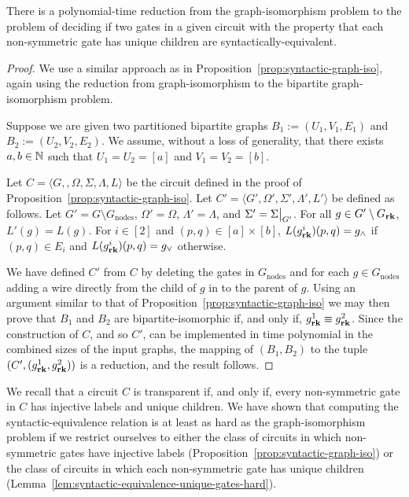 \documentclass[../paper.tex]{subfiles}
\begin{document}
\begin{lem}
  There is a polynomial-time reduction from the graph-isomorphism problem to the
  problem of deciding if two gates in a given circuit with the property that
  each non-symmetric gate has unique children are syntactically-equivalent.
  \label{lem:syntactic-equivalence-unique-gates-hard}
\end{lem}
\begin{proof}
  We use a similar approach as in Proposition~\ref{prop:syntactic-graph-iso},
  again using the reduction from graph-isomorphism to the bipartite
  graph-isomorphism problem.
  
  Suppose we are given two partitioned bipartite graphs $B_1 := (U_1, V_1, E_1)$
  and $B_2 := (U_2, V_2, E_2)$. We assume, without a loss of generality, that
  there exists $a, b \in \mathbb{N}$ such that $U_1 = U_2 = [a]$ and $V_1 = V_2 =
  [b]$.

  Let $C = \langle G, , \Omega, \Sigma, \Lambda, L \rangle$ be the circuit
  defined in the proof of Proposition~\ref{prop:syntactic-graph-iso}. Let $C' =
  \langle G', \Omega', \Sigma', \Lambda', L'\rangle$ be defined as follows. Let
  $G' = G \setminus G_{\text{nodes}}$, $\Omega' = \Omega$, $\Lambda' = \Lambda$,
  and $\Sigma' = \restr{\Sigma}{G'}$. For all $g \in G' \setminus G_{\text{\textbf{rk}}}$,
  $L'(g) = L(g)$. For $i \in [2]$ and $(p,q) \in [a] \times [b]$,
  $L(g^i_{\text{\textbf{rk}}})(p,q) = g_{\land}$ if $(p,q) \in E_i$ and $L(g^i_{\text{\textbf{rk}}})(p,q)
  = g_{\lor}$ otherwise.

  We have defined $C'$ from $C$ by deleting the gates in $G_{\text{nodes}}$ and
  for each $g \in G_{\text{nodes}}$ adding a wire directly from the child of $g$
  in to the parent of $g$. Using an argument similar to that of
  Proposition~\ref{prop:syntactic-graph-iso} we may then prove that $B_1$ and
  $B_2$ are bipartite-isomorphic if, and only if, $g^1_{\text{\textbf{rk}}} \equiv
  g^2_{\text{\textbf{rk}}}$. Since the construction of $C$, and so $C'$, can be implemented
  in time polynomial in the combined sizes of the input graphs, the mapping of
  $(B_1, B_2)$ to the tuple $(C', (g^1_{\text{\textbf{rk}}}, g^2_{\text{\textbf{rk}}}))$ is a reduction,
  and the result follows.
\end{proof}

We recall that a circuit $C$ is transparent if, and only if, every non-symmetric
gate in $C$ has injective labels and unique children. We have shown that
computing the syntactic-equivalence relation is at least as hard as the
graph-isomorphism problem if we restrict ourselves to either the class of
circuits in which non-symmetric gates have injective labels
(Proposition~\ref{prop:syntactic-graph-iso}) or the class of circuits in which
each non-symmetric gate has unique children
(Lemma~\ref{lem:syntactic-equivalence-unique-gates-hard}).
\end{document}
